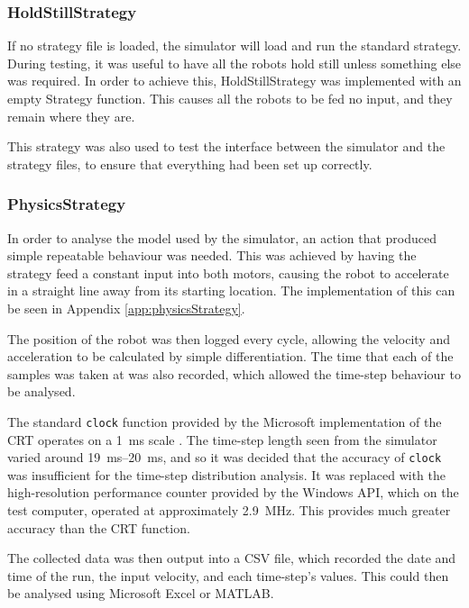 \documentclass[10pt]{article}
\begin{document}
\subsubsection{HoldStillStrategy}

If no strategy file is loaded, the simulator will load and run the standard
strategy.  During testing, it was useful to have all the robots hold still
unless something else was required.  In order to achieve this, HoldStillStrategy
was implemented with an empty Strategy function.  This causes all the robots to
be fed no input, and they remain where they are.

This strategy was also used to test the interface between the simulator and the
strategy files, to ensure that everything had been set up correctly.

\subsubsection{PhysicsStrategy}

In order to analyse the model used by the simulator, an action that produced
simple repeatable behaviour was needed.  This was achieved by having the
strategy feed a constant input into both motors, causing the robot to accelerate
in a straight line away from its starting location.  The implementation of this
can be seen in Appendix \ref{app:physicsStrategy}.

The position of the robot was then logged every cycle, allowing the velocity and
acceleration to be calculated by simple differentiation.  The time that each of
the samples was taken at was also recorded, which allowed the time-step
behaviour to be analysed.

The standard \texttt{clock} function provided by the Microsoft implementation of
the CRT operates on a \SI{1}{\milli\second} scale \cite{windowsSDK}.  The
time-step length seen from the simulator varied around
\SIrange{19}{20}{\milli\second}, and so it was decided that the accuracy of
\texttt{clock} was insufficient for the time-step distribution analysis. It was
replaced with the high-resolution performance counter provided by the Windows
API, which on the test computer, operated at approximately
\SI{2.9}{\mega\hertz}. This provides much greater accuracy than the CRT
function.

The collected data was then output into a CSV file, which recorded the date and
time of the run, the input velocity, and each time-step's values.  This could
then be analysed using Microsoft Excel or MATLAB.
\end{document}
